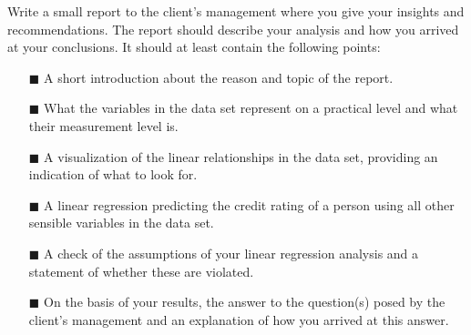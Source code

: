 Write a small report to the client's management where you give your insights and recommendations. The report should describe your analysis and how you arrived at your conclusions. It should at least contain the following points: \\

\begin{itemize}
    \item[$\blacksquare$] A short introduction about the reason and topic of the report.
    \item[$\blacksquare$] What the variables in the data set represent on a practical level and what their measurement level is. 
    \item[$\blacksquare$] A visualization of the linear relationships in the data set, providing an indication of what to look for. 
    \item[$\blacksquare$] A linear regression predicting the credit rating of a person using all other sensible variables in the data set.
    \item[$\blacksquare$] A check of the assumptions of your linear regression analysis and a statement of whether these are violated.
    \item[$\blacksquare$] On the basis of your results, the answer to the question(s) posed by the client's management and an explanation of how you arrived at this answer.
\end{itemize}

\clearpage %